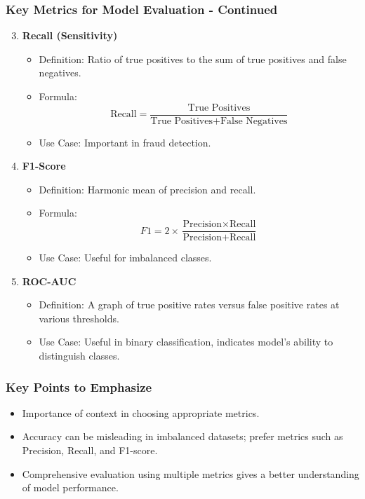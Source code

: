 \documentclass[aspectratio=169]{beamer}
\begin{document}
\begin{frame}[fragile]
    \frametitle{Key Metrics for Model Evaluation - Continued}
    \begin{enumerate}
        \setcounter{enumi}{2} %
        \item \textbf{Recall (Sensitivity)}
            \begin{itemize}
                \item Definition: Ratio of true positives to the sum of true positives and false negatives.
                \item Formula:
                \[
                \text{Recall} = \frac{\text{True Positives}}{\text{True Positives} + \text{False Negatives}} 
                \]
                \item Use Case: Important in fraud detection.
            \end{itemize}
        \item \textbf{F1-Score}
            \begin{itemize}
                \item Definition: Harmonic mean of precision and recall.
                \item Formula:
                \[
                F1 = 2 \times \frac{\text{Precision} \times \text{Recall}}{\text{Precision} + \text{Recall}} 
                \]
                \item Use Case: Useful for imbalanced classes.
            \end{itemize}
        \item \textbf{ROC-AUC}
            \begin{itemize}
                \item Definition: A graph of true positive rates versus false positive rates at various thresholds.
                \item Use Case: Useful in binary classification, indicates model's ability to distinguish classes.
            \end{itemize}
    \end{enumerate}
\end{frame}

\begin{frame}[fragile]
    \frametitle{Key Points to Emphasize}
    \begin{itemize}
        \item Importance of context in choosing appropriate metrics.
        \item Accuracy can be misleading in imbalanced datasets; prefer metrics such as Precision, Recall, and F1-score.
        \item Comprehensive evaluation using multiple metrics gives a better understanding of model performance.
    \end{itemize}
\end{frame}
\end{document}
